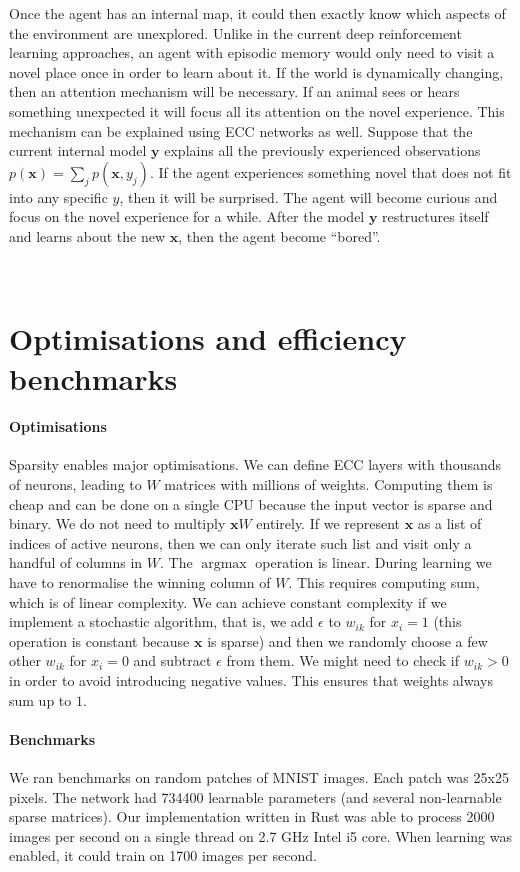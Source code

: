 \documentclass[12pt]{article}
\DeclareMathOperator*{\argmax}{argmax}
\begin{document}
Once the agent has an internal map, it could then exactly know which aspects of the environment are unexplored. Unlike in the current deep reinforcement learning approaches, an agent with episodic memory would only need to visit a novel place once in order to learn about it. If the world is dynamically changing, then an attention mechanism will be necessary. If an animal sees or hears something unexpected it will focus all its attention on the novel experience. This mechanism can be explained using ECC networks as well. Suppose that the current internal model $\boldsymbol{y}$ explains all the previously experienced observations $p(\boldsymbol{x})=\sum_j p(\boldsymbol{x},y_j)$. If the agent experiences something novel that does not fit into any specific $y$, then it will be surprised. The agent will become curious and focus on the novel experience for a while. After the model  $\boldsymbol{y}$ restructures itself and learns about the new $\boldsymbol{x}$, then the agent become ``bored''. 

\


\section{Optimisations and efficiency benchmarks}

\paragraph{Optimisations}
Sparsity enables major optimisations. We can define ECC layers with thousands of neurons, leading to $W$ matrices with millions of weights. Computing them is cheap and can be done on a single CPU because the input vector is sparse and binary. We do not need to multiply $\boldsymbol{x}W$ entirely. If we represent $\boldsymbol{x}$ as a list of indices of active neurons, then we can only iterate such list and visit only a handful of columns in $W$. The $\argmax$ operation is linear. During learning we have to renormalise the winning column of $W$. This requires computing sum, which is of linear complexity. We can achieve constant complexity if we implement a stochastic algorithm, that is, we add $\epsilon$ to $w_{ik}$ for $x_i=1$ (this operation is constant because $\boldsymbol{x}$ is sparse) and then we randomly choose a few other $w_{ik}$ for $x_i=0$ and subtract $\epsilon$ from them. We might need to check if $w_{ik}>0$ in order to avoid introducing negative values. This ensures that weights always sum up to $1$.

\paragraph{Benchmarks}
We ran benchmarks on random patches of MNIST images. Each patch was 25x25 pixels. The network had 734400 learnable parameters (and several non-learnable sparse matrices). Our implementation written in Rust was able to process 2000 images per second on a single thread on 2.7 GHz Intel i5 core. When learning was enabled, it could train on 1700 images per second.
\end{document}
